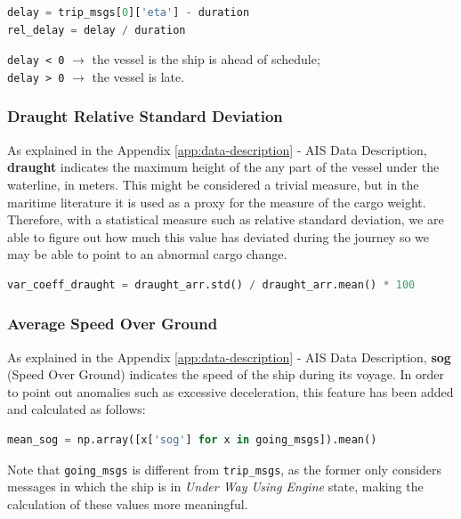        \begin{lstlisting}[language=Python]
delay = trip_msgs[0]['eta'] - duration
rel_delay = delay / duration
        \end{lstlisting} 
        
        \verb|delay < 0| $\rightarrow$ the vessel is the ship is ahead of schedule;
        \\
        \verb|delay > 0| $\rightarrow$ the vessel is late.
    
    \subsubsection{Draught Relative Standard Deviation}
    As explained in the Appendix \ref{app:data-description} - AIS Data Description, \textbf{draught} indicates the maximum height of the any part of the vessel under the waterline, in meters. This might be considered a trivial measure, but in the maritime literature it is used as a proxy for the measure of the cargo weight. Therefore, with a statistical measure such as relative standard deviation, we are able to figure out how much this value has deviated during the journey so we may be able to point to an abnormal cargo change.
    
    \begin{lstlisting}[language=Python]
var_coeff_draught = draught_arr.std() / draught_arr.mean() * 100
    \end{lstlisting} 
    
        
    \subsubsection{Average Speed Over Ground}
    
    As explained in the Appendix \ref{app:data-description} - AIS Data Description, \textbf{sog} (Speed Over Ground) indicates the speed of the ship during its voyage. In order to point out anomalies such as excessive deceleration, this feature has been added and calculated as follows:
    
    \begin{lstlisting}[language=Python]
mean_sog = np.array([x['sog'] for x in going_msgs]).mean()
    \end{lstlisting} 
    
    Note that \verb|going_msgs| is different from \verb|trip_msgs|, as the former only considers messages in which the ship is in \textit{Under Way Using Engine} state, making the calculation of these values more meaningful.
            
